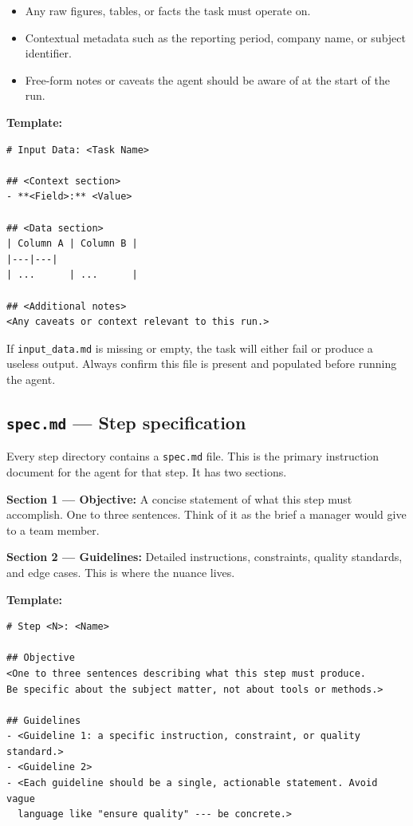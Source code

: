 \documentclass[12pt, a4paper]{article}
\begin{document}
\begin{itemize}[leftmargin=1.5em]
  \item Any raw figures, tables, or facts the task must operate on.
  \item Contextual metadata such as the reporting period, company name, or subject identifier.
  \item Free-form notes or caveats the agent should be aware of at the start of the run.
\end{itemize}

\textbf{Template:}

\begin{lstlisting}[language={}]
# Input Data: <Task Name>

## <Context section>
- **<Field>:** <Value>

## <Data section>
| Column A | Column B |
|---|---|
| ...      | ...      |

## <Additional notes>
<Any caveats or context relevant to this run.>
\end{lstlisting}

\begin{warnbox}
If \texttt{input\_data.md} is missing or empty, the task will either fail or produce a useless output. Always confirm this file is present and populated before running the agent.
\end{warnbox}

\subsection{\texttt{spec.md} --- Step specification}

Every step directory contains a \texttt{spec.md} file. This is the primary instruction document for the agent for that step. It has two sections.

\textbf{Section 1 --- Objective:} A concise statement of what this step must accomplish. One to three sentences. Think of it as the brief a manager would give to a team member.

\textbf{Section 2 --- Guidelines:} Detailed instructions, constraints, quality standards, and edge cases. This is where the nuance lives.

\textbf{Template:}

\begin{lstlisting}[language={}]
# Step <N>: <Name>

## Objective
<One to three sentences describing what this step must produce.
Be specific about the subject matter, not about tools or methods.>

## Guidelines
- <Guideline 1: a specific instruction, constraint, or quality standard.>
- <Guideline 2>
- <Each guideline should be a single, actionable statement. Avoid vague
  language like "ensure quality" --- be concrete.>
\end{lstlisting}
\end{document}

